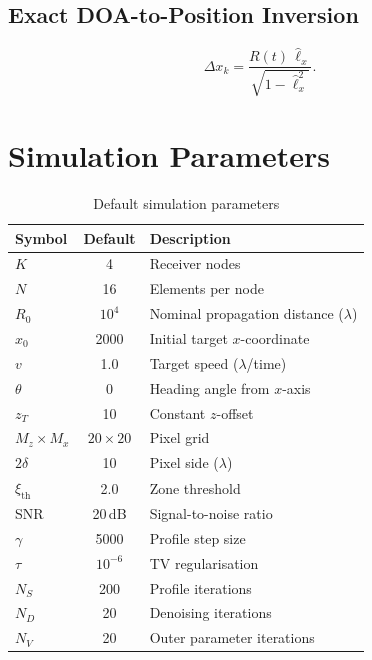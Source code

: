 \documentclass[11pt,a4paper]{article}
\begin{document}
\subsection{Exact DOA-to-Position Inversion}
\begin{equation}
  \Delta x_k = \frac{R(t)\,\hat{\ell}_x}
  {\sqrt{1-\hat{\ell}_x^2}}.
  \label{eq:exact_inversion}
\end{equation}

\section{Simulation Parameters}
\label{sec:params}

\begin{table}[H]
\centering
\caption{Default simulation parameters}
\label{tab:params}
\begin{tabular}{@{}lcl@{}}
\toprule
\textbf{Symbol} & \textbf{Default} & \textbf{Description} \\
\midrule
$K$ & 4 & Receiver nodes \\
$N$ & 16 & Elements per node \\
$R_0$ & $10^4$ & Nominal propagation distance ($\lambda$) \\
$x_0$ & 2000 & Initial target $x$-coordinate \\
$v$ & 1.0 & Target speed ($\lambda$/time) \\
$\theta$ & 0 & Heading angle from $x$-axis \\
$z_T$ & 10 & Constant $z$-offset \\
$M_z{\times}M_x$ & $20{\times}20$ & Pixel grid \\
$2\delta$ & 10 & Pixel side ($\lambda$) \\
$\xi_{\mathrm{th}}$ & 2.0 & Zone threshold \\
SNR & 20\,dB & Signal-to-noise ratio \\
\midrule
$\gamma$ & 5000 & Profile step size \\
$\tau$ & $10^{-6}$ & TV regularisation \\
$N_S$ & 200 & Profile iterations \\
$N_D$ & 20 & Denoising iterations \\
$N_V$ & 20 & Outer parameter iterations \\
\bottomrule
\end{tabular}
\end{table}
\end{document}

